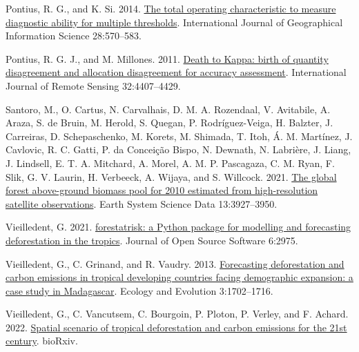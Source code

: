 \documentclass[paper=a4, 12pt, DIV=12]{scrartcl}
\begin{document}
\begin{hangparas}{1.5em}{1}
\hypertarget{citeproc_bib_item_1}{Pontius, R. G., and K. Si. 2014. \href{https://doi.org/10.1080/13658816.2013.862623}{The total operating characteristic to measure diagnostic ability for multiple thresholds}. International Journal of Geographical Information Science 28:570–583.}

\hypertarget{citeproc_bib_item_2}{Pontius, R. G. J., and M. Millones. 2011. \href{https://doi.org/10.1080/01431161.2011.552923}{Death to Kappa: birth of quantity disagreement and allocation disagreement for accuracy assessment}. International Journal of Remote Sensing 32:4407–4429.}

\hypertarget{citeproc_bib_item_3}{Santoro, M., O. Cartus, N. Carvalhais, D. M. A. Rozendaal, V. Avitabile, A. Araza, S. de Bruin, M. Herold, S. Quegan, P. Rodríguez-Veiga, H. Balzter, J. Carreiras, D. Schepaschenko, M. Korets, M. Shimada, T. Itoh, Á. M. Martínez, J. Cavlovic, R. C. Gatti, P. da Conceição Bispo, N. Dewnath, N. Labrière, J. Liang, J. Lindsell, E. T. A. Mitchard, A. Morel, A. M. P. Pascagaza, C. M. Ryan, F. Slik, G. V. Laurin, H. Verbeeck, A. Wijaya, and S. Willcock. 2021. \href{https://doi.org/10.5194/essd-13-3927-2021}{The global forest above-ground biomass pool for 2010 estimated from high-resolution satellite observations}. Earth System Science Data 13:3927–3950.}

\hypertarget{citeproc_bib_item_4}{Vieilledent, G. 2021. \href{https://doi.org/10.21105/joss.02975}{forestatrisk: a Python package for modelling and forecasting deforestation in the tropics}. Journal of Open Source Software 6:2975.}

\hypertarget{citeproc_bib_item_5}{Vieilledent, G., C. Grinand, and R. Vaudry. 2013. \href{https://doi.org/10.1002/ece3.550}{Forecasting deforestation and carbon emissions in tropical developing countries facing demographic expansion: a case study in Madagascar}. Ecology and Evolution 3:1702–1716.}

\hypertarget{citeproc_bib_item_6}{Vieilledent, G., C. Vancutsem, C. Bourgoin, P. Ploton, P. Verley, and F. Achard. 2022. \href{https://doi.org/10.1101/2022.03.22.485306}{Spatial scenario of tropical deforestation and carbon emissions for the 21st century}. bioRxiv.}
\end{hangparas}
\end{document}

